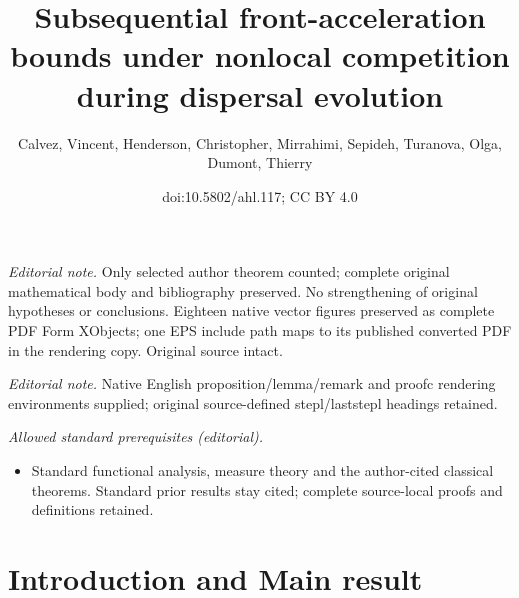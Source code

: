 \documentclass[10pt]{amsart}
\title{Subsequential front-acceleration bounds under nonlocal competition during dispersal evolution}
\author{Calvez, Vincent, Henderson, Christopher, Mirrahimi, Sepideh, Turanova, Olga, Dumont, Thierry}
\date{doi:10.5802/ahl.117; CC BY 4.0}
\theoremstyle{definition}\newtheorem{defi}[theo]{Definition}\newtheorem{rema}[theo]{Remark}\newtheorem{exam}[theo]{Example}\newtheorem{exem}[theo]{Example}\newtheorem{nota}[theo]{Notation}
\newcommand{\1}{\mathds{1}}
\begin{document}
\maketitle
\noindent\textit{Editorial note.} Only selected author theorem counted; complete original mathematical body and bibliography preserved. No strengthening of original hypotheses or conclusions. Eighteen native vector figures preserved as complete PDF Form XObjects; one EPS include path maps to its published converted PDF in the rendering copy. Original source intact.\par\medskip
\noindent\textit{Editorial note.} Native English proposition/lemma/remark and proofc rendering environments supplied; original source-defined stepl/laststepl headings retained.\par\medskip
\noindent\textit{Allowed standard prerequisites (editorial).}\begin{itemize}
\item Standard functional analysis, measure theory and the author-cited classical theorems. Standard prior results stay cited; complete source-local proofs and definitions retained.
\end{itemize}\medskip



\section{Introduction and Main result}\label{sec:intro}
\end{document}

